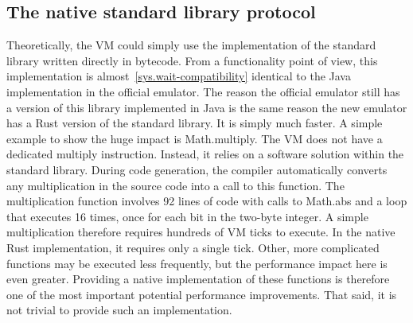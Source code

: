 \subsection{The native standard library protocol} \label{jack-stdlib-in-rust}
Theoretically, the VM could simply use the implementation of the standard library written directly in bytecode.
From a functionality point of view, this implementation is almost~\ref{sys.wait-compatibility} identical to the Java implementation in the official emulator.
The reason the official emulator still has a version of this library implemented in Java is the same reason the new emulator has a Rust version of the standard library. It is simply much faster.
A simple example to show the huge impact is Math.multiply. The VM does not have a dedicated multiply instruction. Instead, it relies on a software solution within the standard library. During code generation, the compiler automatically converts any multiplication in the source code into a call to this function.
The multiplication function involves 92 lines of code with calls to Math.abs and a loop that executes 16 times, once for each bit in the two-byte integer. A simple multiplication therefore requires hundreds of VM ticks to execute.
In the native Rust implementation, it requires only a single tick.
Other, more complicated functions may be executed less frequently, but the performance impact here is even greater.
Providing a native implementation of these functions is therefore one of the most important potential performance improvements.
That said, it is not trivial to provide such an implementation.

